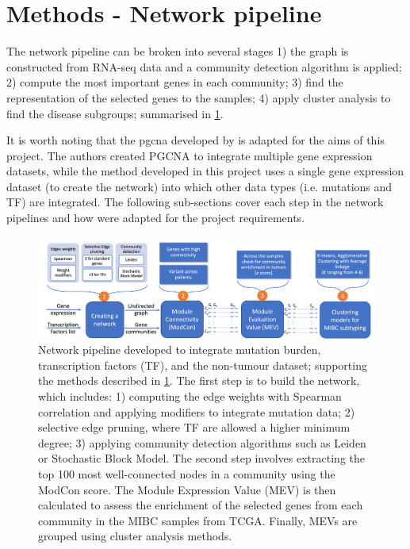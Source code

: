\section{Methods - Network pipeline} \label{s:N_I:methods}

The network pipeline can be broken into several stages 1) the graph is constructed from RNA-seq data and a community detection algorithm is applied; 2) compute the most important genes in each community; 3) find the representation of the selected genes to the samples; 4) apply cluster analysis to find the disease subgroups; summarised in \cref{fig:N_I:network_pipeline}.

It is worth noting that the \acrfull{pgcna} developed by \citet{Care2019-ij} is adapted for the aims of this project. The authors created PGCNA to integrate multiple gene expression datasets, while the method developed in this project uses a single gene expression dataset (to create the network) into which other data types (i.e. mutations and TF) are integrated. The following sub-sections cover each step in the network pipelines and how were adapted for the project requirements.

\begin{figure}
    \centering
    \includegraphics[width=1.0\textwidth,keepaspectratio]{Sections/Network_I/Resources/Methods/network_pipeline.png}
    \caption[The integrative network pipeline]{Network pipeline developed to integrate mutation burden, transcription factors (TF), and the non-tumour dataset; supporting the methods described in \cref{s:N_I:methods}. The first step is to build the network, which includes: 1) computing the edge weights with Spearman correlation and applying modifiers to integrate mutation data; 2) selective edge pruning, where TF are allowed a higher minimum degree; 3) applying community detection algorithms such as Leiden or Stochastic Block Model. The second step involves extracting the top 100 most well-connected nodes in a community using the ModCon score. The Module Expression Value (MEV) is then calculated to assess the enrichment of the selected genes from each community in the MIBC samples from TCGA. Finally, MEVs are grouped using cluster analysis methods.}
    \hfill
    \label{fig:N_I:network_pipeline}
\end{figure}

